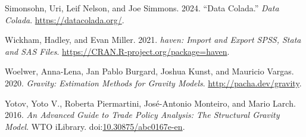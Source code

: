 \documentclass[letterpaper,twoside,12pt]{article}
\newlength{\cslhangindent}
\newenvironment{CSLReferences}[2] %
 {\begin{list}{}{%
  \setlength{\itemindent}{0pt}
  \setlength{\leftmargin}{0pt}
  \setlength{\parsep}{0pt}
  \ifodd #1
   \setlength{\leftmargin}{\cslhangindent}
   \setlength{\itemindent}{-1\cslhangindent}
  \fi
  \setlength{\itemsep}{#2\baselineskip}}}
 {\end{list}}
\begin{document}
\begin{CSLReferences}{1}{0}
Simonsohn, Uri, Leif Nelson, and Joe Simmons. 2024. {``Data {Colada}.''}
\emph{Data Colada}. \url{https://datacolada.org/}.

Wickham, Hadley, and Evan Miller. 2021. \emph{{haven: Import and Export
SPSS, Stata and SAS Files}}.
\url{https://CRAN.R-project.org/package=haven}.

Woelwer, Anna-Lena, Jan Pablo Burgard, Joshua Kunst, and Mauricio
Vargas. 2020. \emph{Gravity: Estimation Methods for Gravity Models}.
\url{http://pacha.dev/gravity}.

Yotov, Yoto V., Roberta Piermartini, José-Antonio Monteiro, and Mario
Larch. 2016. \emph{An {Advanced} {Guide} to {Trade} {Policy}
{Analysis}\hspace{0pt}: {The} {Structural} {Gravity} {Model}}. WTO
iLibrary.
doi:\href{https://doi.org/10.30875/abc0167e-en}{10.30875/abc0167e-en}.

\end{CSLReferences}
\end{document}

